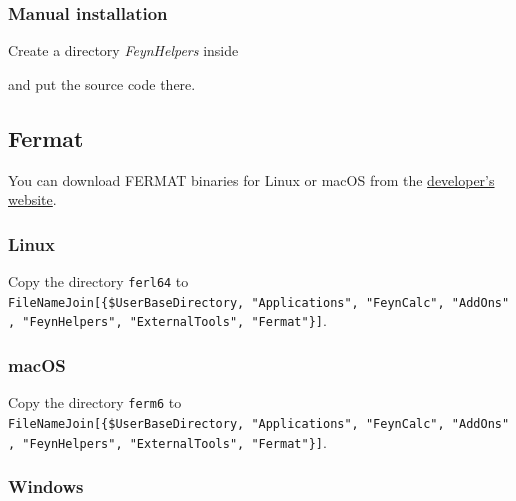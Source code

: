\documentclass[../FeynHelpersManual.tex]{subfiles}
\begin{document}
\subsubsection{Manual installation}\label{manual-installation}

Create a directory \emph{FeynHelpers} inside

\begin{Shaded}
\begin{Highlighting}[]
\OperatorTok{[\{}\OperatorTok{,} \OperatorTok{,} \OperatorTok{,} \OperatorTok{\}]}
\end{Highlighting}
\end{Shaded}

and put the source code there.

\subsection{Fermat}\label{fermat}

You can download FERMAT binaries for Linux or macOS from the
\href{https://home.bway.net/lewis/zip.html}{developer's website}.

\subsubsection{Linux}\label{linux}

Copy the directory \texttt{ferl64} to
\texttt{FileNameJoin[\allowbreak{}\{\allowbreak{}\$UserBaseDirectory,\ \allowbreak{}"Applications",\ \allowbreak{}"FeynCalc",\ \allowbreak{}"AddOns",\ \allowbreak{}"FeynHelpers",\ \allowbreak{}"ExternalTools",\ \allowbreak{}"Fermat"\}]}.

\subsubsection{macOS}\label{macos}

Copy the directory \texttt{ferm6} to
\texttt{FileNameJoin[\allowbreak{}\{\allowbreak{}\$UserBaseDirectory,\ \allowbreak{}"Applications",\ \allowbreak{}"FeynCalc",\ \allowbreak{}"AddOns",\ \allowbreak{}"FeynHelpers",\ \allowbreak{}"ExternalTools",\ \allowbreak{}"Fermat"\}]}.

\subsubsection{Windows}\label{windows}
\end{document}
